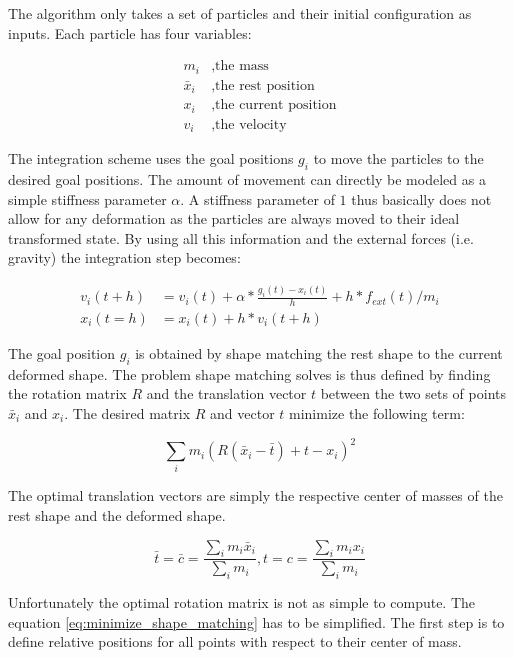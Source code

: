 The algorithm only takes a set of particles and their initial configuration as inputs. Each particle has four variables:

\begin{align*}
m_i &, \text{the mass} \\
\bar{x}_i &, \text{the rest position} \\
x_i &, \text{the current position} \\
v_i &, \text{the velocity}
\end{align*}

The integration scheme uses the goal positions \(g_i\) to move the particles to the desired goal positions. The amount of movement can directly be modeled as a simple stiffness parameter \(\alpha\). A stiffness parameter of \(1\) thus basically does not allow for any deformation as the particles are always moved to their ideal transformed state. By using all this information and the external forces (i.e. gravity) the integration step becomes:

\begin{align}
v_i(t+h) &= v_i(t) + \alpha * \frac{g_i(t)-x_i(t)}{h} + h * f_{ext}(t)/m_i \\
x_i(t=h) &= x_i(t) + h * v_i(t+h)
\end{align}

The goal position \(g_i\) is obtained by shape matching the rest shape to the current deformed shape. The problem shape matching solves is thus defined by finding the rotation matrix \(R\) and the translation vector \(t\) between the two sets of points \(\bar{x}_i\) and \(x_i\). The desired matrix \(R\) and vector \(t\) minimize the following term:

\begin{equation}
\sum\limits_i m_i(R(\bar{x}_i-\bar{t})+t-x_i)^2
\label{eq:minimize_shape_matching}
\end{equation}

The optimal translation vectors are simply the respective center of masses of the rest shape and the deformed shape.

\begin{equation}
\bar{t} = \bar{c} = \frac{\sum_{i} m_i \bar{x}_i}{\sum_{i}m_i}, t = c = \frac{\sum_{i} m_i x_i}{\sum_{i}m_i}
\end{equation}

Unfortunately the optimal rotation matrix is not as simple to compute. The equation \ref{eq:minimize_shape_matching} has to be simplified. The first step is to define relative positions for all points with respect to their center of mass.

